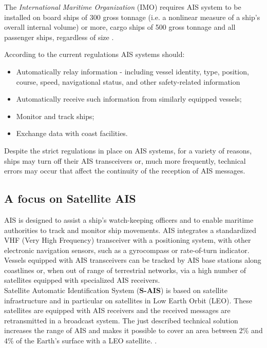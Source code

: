     The \textit{International Maritime Organization} (IMO) requires AIS system to be installed on board ships of 300 gross tonnage (i.e. a nonlinear measure of a ship's overall internal volume) or more, cargo ships of 500 gross tonnage and all passenger ships, regardless of size \cite{ais_regulations}.
    
    According to the current regulations AIS systems should:
    \begin{itemize}
        \item Automatically relay information - including vessel identity, type, position, course, speed, navigational status, and other safety-related information
        \item Automatically receive such information from similarly equipped vessels; 
        \item Monitor and track ships;
        \item Exchange data with coast facilities.
    \end{itemize}

    Despite the strict regulations in place on AIS systems, for a variety of reasons, ships may turn off their AIS transceivers or, much more frequently, technical errors may occur that affect the continuity of the reception of AIS messages.
    
    \subsection{A focus on Satellite AIS}
    AIS is designed to assist a ship's watch-keeping officers and to enable maritime authorities to track and monitor ship movements. AIS integrates a standardized VHF (Very High Frequency) transceiver with a positioning system, with other electronic navigation sensors, such as a gyrocompass or rate-of-turn indicator. Vessels equipped with AIS transceivers can be tracked by AIS base stations along coastlines or, when out of range of terrestrial networks, via a high number of satellites equipped with specialized AIS receivers. 
    \\
    Satellite Automatic Identification System (\textbf{S-AIS}) is based on satellite infrastructure and in particular on satellites in Low Earth Orbit (LEO). These satellites are equipped with AIS receivers and the received messages are retransmitted in a broadcast system.
    The just described technical solution increases the range of AIS and makes it possible to cover an area between 2\% and 4\% of the Earth's surface with a LEO satellite. \cite{dbscan_ais}.
    
